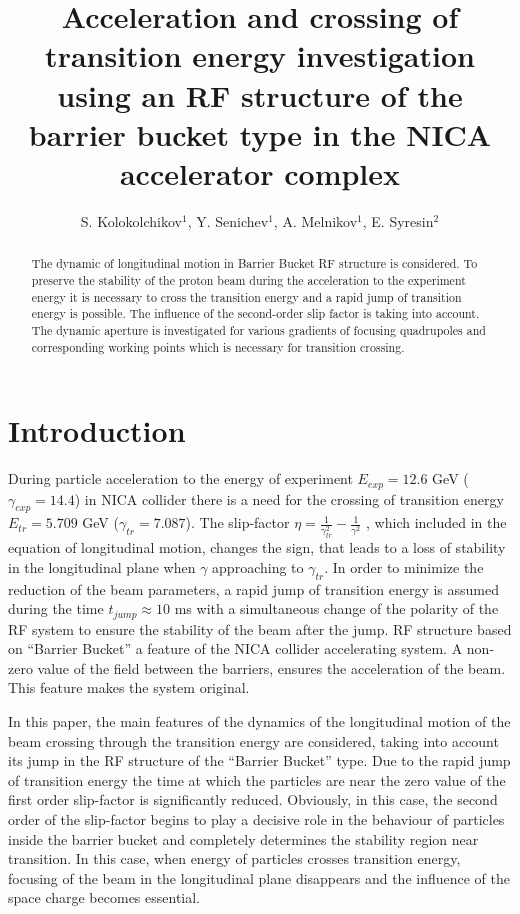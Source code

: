 \documentclass[a4paper]{jpconf}
\begin{document}
\title{Acceleration and crossing of transition energy investigation using an RF structure of the barrier bucket type in the NICA accelerator complex}

\author{S. Kolokolchikov$^1$, Y. Senichev$^1$, A. Melnikov$^1$, E. Syresin$^2$}

\address{$^1$Institute for Nuclear Research of the Russian Academy of Sciences, Moscow, Russia\\
	$^2$Joint Institute for Nuclear Research, Dubna, Russia}


\begin{abstract}
The dynamic of longitudinal motion in Barrier Bucket RF structure is considered. To preserve the stability of the proton beam during the acceleration to the experiment energy it is necessary to cross the transition energy and a rapid jump of transition energy is possible. The influence of the second-order slip factor is taking into account. The dynamic aperture is investigated for various gradients of focusing quadrupoles and corresponding working points which is necessary for transition crossing.
\end{abstract}

\section{Introduction}
\par During particle acceleration  to the energy of experiment $E_{exp}=12.6$ GeV ($\gamma_{exp}=14.4$) in NICA collider there is a need for the crossing of transition energy  $E_{tr}=5.709$ GeV ($\gamma_{tr}=7.087$). The slip-factor $\eta=\frac{1}{\gamma_{tr}^2}-\frac{1}{\gamma^2}$ , which included in the equation of longitudinal motion, changes the sign, that leads to a loss of stability in the longitudinal plane when $\gamma$ approaching to $\gamma_{tr}$. In order to minimize the reduction of the beam parameters, a rapid jump of transition energy is assumed during the time $t_{jump}\approx10$ ms \cite{NICA} with a simultaneous change of the polarity of the RF system to ensure the stability of the beam after the jump. RF structure based on “Barrier Bucket” a feature of the NICA collider accelerating system. A non-zero value of the field between the barriers, ensures the acceleration of the beam. This feature makes the system original.

\par In this paper, the main features of the dynamics of the longitudinal motion of the beam crossing through the transition energy are considered, taking into account its jump in the RF structure of the “Barrier Bucket” type. Due to the rapid jump of transition energy the time at which the particles are near the zero value of the first order slip-factor is significantly reduced.  Obviously, in this case, the second order of the slip-factor begins to play a decisive role in the behaviour of particles inside the barrier bucket and completely determines the stability region near transition. In this case, when energy of particles crosses transition energy, focusing of the beam in the longitudinal plane disappears and the influence of the space charge becomes essential.
\end{document}
